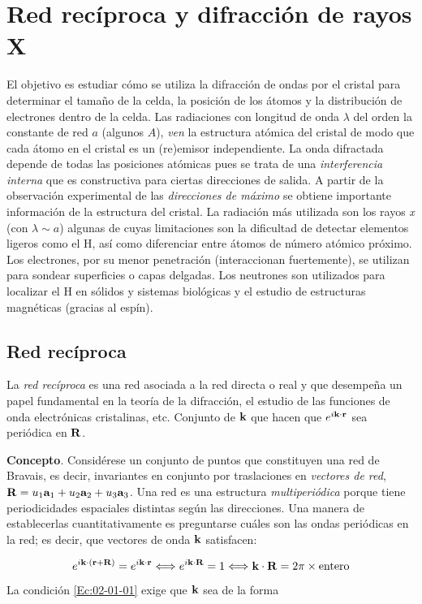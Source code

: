 \chapter{Red recíproca y difracción de rayos X} \label{Ch:02}

El objetivo es estudiar cómo se utiliza la difracción de ondas por el cristal para determinar el tamaño de la celda, la posición de los átomos y la distribución de electrones dentro de la celda. Las radiaciones con longitud de onda $\lambda$ del orden la constante de red $a$   (algunos $ A$), {\it ven} la estructura atómica del cristal de modo que cada átomo en el cristal es un (re)emisor independiente. La onda difractada depende de todas las posiciones atómicas pues se trata de una \textit{interferencia interna} que es constructiva para ciertas direcciones de salida. A partir de la observación experimental de las \textit{direcciones de máximo} se obtiene importante información de la estructura del cristal. La radiación más utilizada son los rayos {\it x} (con $\lambda \sim a$) algunas de cuyas limitaciones son la dificultad de detectar elementos ligeros como el H, así como diferenciar entre átomos de número atómico próximo. Los electrones, por su menor penetración (interaccionan fuertemente), se utilizan para sondear superficies o capas delgadas. Los neutrones son utilizados para localizar el H en sólidos y sistemas biológicas y el estudio de estructuras magnéticas (gracias al espín).

\section{Red recíproca}

La \textit{red recíproca} es una red asociada a la red directa o real y que desempeña un papel fundamental en la teoría de la difracción, el estudio de las funciones de onda electrónicas cristalinas, etc.  Conjunto de $\mathbf{k}$ que hacen que $e^{i\mathbf{k} \cdot \mathbf{r}}$ sea periódica en $\mathbf{R}$. 

\textbf{Concepto}. Considérese un conjunto de puntos que constituyen una red de Bravais, es decir, invariantes en conjunto por traslaciones en \textit{vectores de red}, $\mathbf{R} = u_1 \mathbf{a}_1 + u_2 \mathbf{a}_2 + u_3 \mathbf{a}_3$. Una red es una estructura \textit{multiperiódica} porque tiene periodicidades espaciales distintas según las direcciones. Una manera de establecerlas cuantitativamente es preguntarse cuáles son las ondas periódicas en la red; es decir, que vectores de onda $\mathbf{k}$ satisfacen:

\begin{equation}
    e^{i\mathbf{k} \cdot (\mathbf{r} + \mathbf{R})} = e^{i \mathbf{k} \cdot \mathbf{r}} \Longleftrightarrow  e^{i \mathbf{k} \cdot \mathbf{R}} = 1 \Longleftrightarrow \mathbf{k} \cdot \mathbf{R} = 2\pi \times \text{entero} \label{Ec:02-01-01}
\end{equation}
La condición \ref{Ec:02-01-01} exige que $\mathbf{k}$ sea de la forma 

